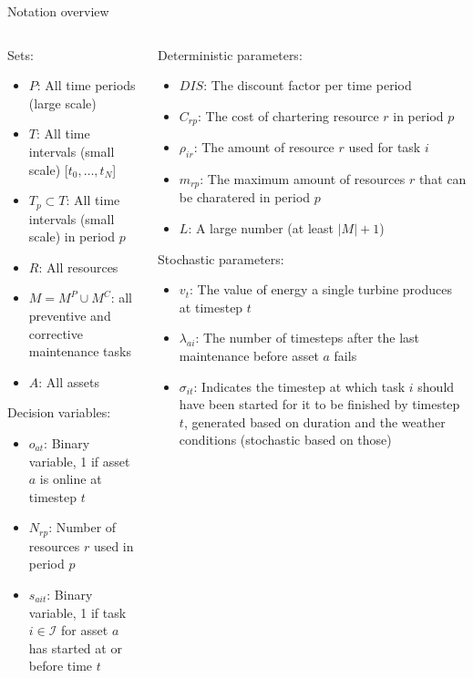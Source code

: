 \documentclass{beamer}
\begin{document}
\begin{frame}{Notation overview}
\tiny

\begin{columns}
\begin{column}{.48\textwidth}
Sets:
\begin{itemize}
\item $P$: All time periods (large scale)
\item $T$: All time intervals (small scale) [$t_0, \dots , t_N$]
\item $T_p \subset T$: All time intervals (small scale) in period $p$
\item $R$: All resources
\item $M = M^P \cup M^C$: all preventive and corrective maintenance tasks
\item $A$: All assets
\end{itemize}

Decision variables:
\begin{itemize}
\item $o_{at}$: Binary variable, 1 if asset $a$ is online at timestep $t$
\item $N_{rp}$: Number of resources $r$ used in period $p$
\item $s_{ait}$: Binary variable, 1 if task $i \in \mathcal{I}$ for asset $a$ has started at or before time $t$
\end{itemize}
\end{column}

\hfill

\begin{column}{.48\textwidth}
Deterministic parameters:
\begin{itemize}
\item $DIS$: The discount factor per time period
\item $C_{rp}$: The cost of chartering resource $r$ in period $p$
\item $\rho_{ir}$: The amount of resource $r$ used for task $i$
\item $m_{rp}$: The maximum amount of resources $r$ that can be charatered in period $p$
\item $L$: A large number (at least $|M|+1$)
\end{itemize}

Stochastic parameters:
\begin{itemize}
\item $v_t$: The value of energy a single turbine produces at timestep $t$
\item $\lambda_{ai}$: The number of timesteps after the last maintenance before asset $a$ fails
\item $\sigma_{it}$: Indicates the timestep at which task $i$ should have been started for it to be finished by timestep $t$, generated based on duration and the weather conditions (stochastic based on those)
\end{itemize}
\end{column}
\end{columns}

\end{frame}
\end{document}
